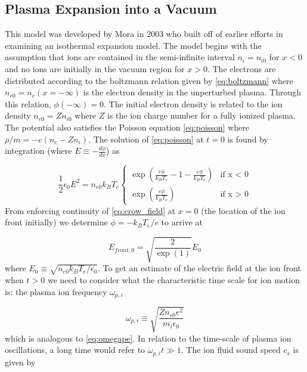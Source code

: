 \subsection{Plasma Expansion into a Vacuum}

This model was developed by Mora \cite{Mora_2003_PRL} in 2003 who built off of earlier efforts \cite{Crow_1975_JPP,Kishimoto_1983_PoF} in examining an isothermal expansion model. The model begins with the assumption that ions are contained in the semi-infinite interval $n_i = n_{i0}$ for $x < 0$ and no ions are initially in the vacuum region for $x > 0$. The electrons are distributed according to the boltzmann relation given by \autoref{eq:boltzmann} where $n_{e0} = n_e(x = -\infty)$ is the electron density in the unperturbed plasma. Through this relation, $\phi(-\infty) = 0$. The initial electron density is related to the ion density $n_{e0} = Z n_{i0}$ where $Z$ is the ion charge number for a fully ionized plasma. The potential also satisfies the Poisson equation \autoref{eq:poisson} where $\rho/m = - e (n_e - Z n_i)$. The solution of \autoref{eq:poisson} at $t=0$ is found by integration \cite{Crow_1975_JPP} (where $E \equiv -\frac{d\phi}{dx}$) as 

\begin{equation}
	\frac{1}{2} \epsilon_0 E^2 = n_{e0} k_B T_e
	\begin{cases}
		\exp(\frac{e \phi}{k_B T_e} - 1 - \frac{e \phi}{k_B T_e}) & \mbox{if x < 0} \\
		\exp(\frac{e \phi}{k_B T_e}) & \mbox{if x > 0} \label{eq:crow_field}
	\end{cases}
\end{equation} 
From enforcing continuity of \autoref{eq:crow_field} at $x=0$ (the location of the ion front initially) we determine $\phi = -k_B T_e / e$ to arrive at  

\begin{equation}
	E_{front,0} = \sqrt{\frac{2}{\exp(1)}} E_0
\end{equation}
where $E_0 \equiv \sqrt{n_{e0} k_B T_e / \epsilon_0}$. To get an estimate of the electric field at the ion front when $t > 0$ we need to consider what the characteristic time scale for ion motion is: the plasma ion frequency $\omega_{p,i}$

\begin{equation}
	\omega_{p,i} \equiv \sqrt{\frac{Z n_{e0} e^2}{m_i \epsilon_0}}	\label{eq:omegapi}
\end{equation} 
which is analogous to \autoref{eq:omegape}. In relation to the time-scale of plasma ion oscillations, a long time would refer to $\omega_{p,i} t \gg 1$. The ion fluid sound speed $c_s$ is given by 

